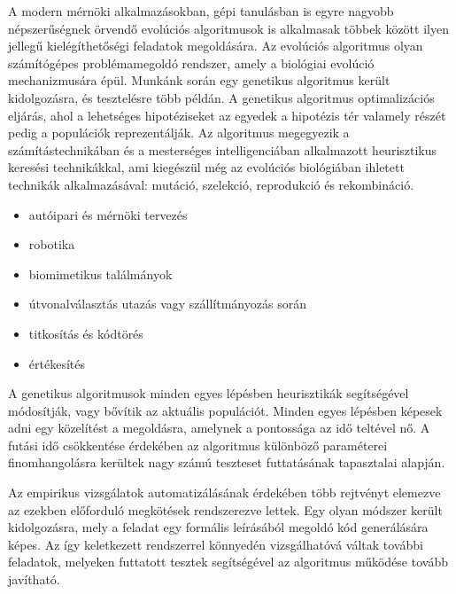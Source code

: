 \documentclass[12pt,a4paper,oneside]{report}
\begin{document}
	A modern mérnöki alkalmazásokban, gépi tanulásban is egyre nagyobb népszerűségnek örvendő evolúciós algoritmusok is alkalmasak többek között ilyen jellegű kielégíthetőségi feladatok megoldására.
    Az evolúciós algoritmus olyan számítógépes problémamegoldó rendszer, amely a biológiai evolúció mechanizmusára épül.
    Munkánk során egy genetikus algoritmus került kidolgozásra, és tesztelésre több példán.
    A genetikus algoritmus optimalizációs eljárás, ahol a lehetséges hipotéziseket az egyedek a hipotézis tér valamely részét pedig a populációk reprezentálják.
    Az algoritmus megegyezik a számítástechnikában és a mesterséges intelligenciában alkalmazott heurisztikus keresési technikákkal, ami kiegészül még az evolúciós biológiában ihletett technikák alkalmazásával: mutáció, szelekció, reprodukció és rekombináció.


	\begin{itemize}
        \item autóipari és mérnöki tervezés
        \item robotika
        \item biomimetikus találmányok
        \item útvonalválasztás utazás vagy szállítmányozás során
        \item titkosítás és kódtörés
        \item értékesítés
	\end{itemize}

	A genetikus algoritmusok minden egyes lépésben heurisztikák segítségével módosítják, vagy bővítik az aktuális populációt.
    Minden egyes lépésben képesek adni egy közelítést a megoldásra, amelynek a pontossága az idő teltével nő.
    A futási idő csökkentése érdekében az algoritmus különböző paraméterei finomhangolásra kerültek nagy számú teszteset futtatásának tapasztalai alapján.

	Az empirikus vizsgálatok automatizálásának érdekében több rejtvényt elemezve az ezekben előforduló megkötések rendszerezve lettek.
    Egy olyan módszer került kidolgozásra, mely a feladat egy formális leírásából megoldó kód generálására képes.
    Az így keletkezett rendszerrel könnyedén vizsgálhatóvá váltak további feladatok, melyeken futtatott tesztek segítségével az algoritmus működése tovább javítható.
\end{document}
